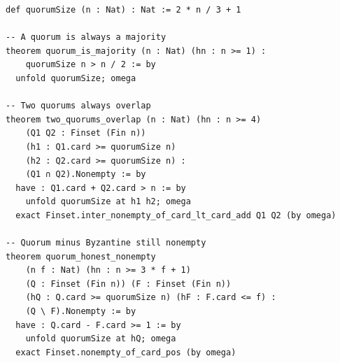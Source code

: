 \begin{lstlisting}[language=Lean,caption={Quorum properties}]
def quorumSize (n : Nat) : Nat := 2 * n / 3 + 1

-- A quorum is always a majority
theorem quorum_is_majority (n : Nat) (hn : n >= 1) :
    quorumSize n > n / 2 := by
  unfold quorumSize; omega

-- Two quorums always overlap
theorem two_quorums_overlap (n : Nat) (hn : n >= 4)
    (Q1 Q2 : Finset (Fin n))
    (h1 : Q1.card >= quorumSize n)
    (h2 : Q2.card >= quorumSize n) :
    (Q1 ∩ Q2).Nonempty := by
  have : Q1.card + Q2.card > n := by
    unfold quorumSize at h1 h2; omega
  exact Finset.inter_nonempty_of_card_lt_card_add Q1 Q2 (by omega)

-- Quorum minus Byzantine still nonempty
theorem quorum_honest_nonempty
    (n f : Nat) (hn : n >= 3 * f + 1)
    (Q : Finset (Fin n)) (F : Finset (Fin n))
    (hQ : Q.card >= quorumSize n) (hF : F.card <= f) :
    (Q \ F).Nonempty := by
  have : Q.card - F.card >= 1 := by
    unfold quorumSize at hQ; omega
  exact Finset.nonempty_of_card_pos (by omega)
\end{lstlisting}

